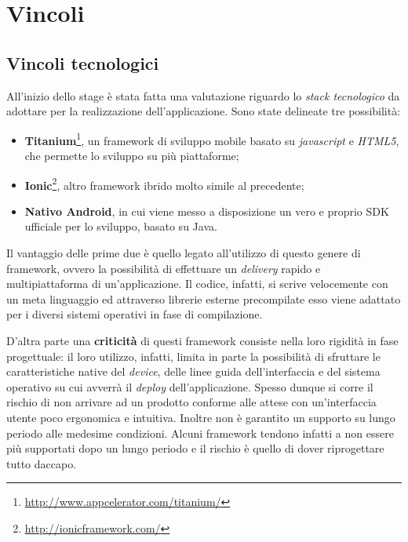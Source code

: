 \section{Vincoli}

\subsection{Vincoli tecnologici}

All'inizio dello stage è stata fatta una valutazione riguardo lo \textit{stack tecnologico} da adottare per la realizzazione dell'applicazione. Sono state delineate tre possibilità:

\begin{itemize}

\item \textbf{Titanium}\footnote{\url{http://www.appcelerator.com/titanium/}}, un framework di sviluppo mobile basato su \textit{javascript} e \textit{HTML5}, che permette lo sviluppo su più piattaforme;

\item \textbf{Ionic}\footnote{\url{http://ionicframework.com/}}, altro framework ibrido molto simile al precedente;

\item \textbf{Nativo Android}, in cui viene messo a disposizione un vero e proprio SDK ufficiale per lo sviluppo, basato su Java.

\end{itemize}

Il vantaggio delle prime due è quello legato all'utilizzo di questo genere di framework, ovvero la possibilità di effettuare un \textit{delivery} rapido e multipiattaforma di un'applicazione. Il codice, infatti, si scrive velocemente con un meta linguaggio ed attraverso librerie esterne precompilate esso viene adattato per i diversi sistemi operativi in fase di compilazione. 

D'altra parte una \textbf{criticità} di questi framework consiste nella loro rigidità in fase progettuale: il loro utilizzo, infatti, limita in parte la possibilità di sfruttare le caratteristiche native del \textit{device}, delle linee guida dell'interfaccia e del sistema operativo su cui avverrà il \textit{deploy} dell'applicazione. Spesso dunque si corre il rischio di non arrivare ad un prodotto conforme alle attese con un'interfaccia utente poco ergonomica e intuitiva. Inoltre non è garantito un supporto su lungo periodo alle medesime condizioni. Alcuni framework tendono infatti a non essere più supportati dopo un lungo periodo e il rischio è quello di dover riprogettare tutto daccapo.

